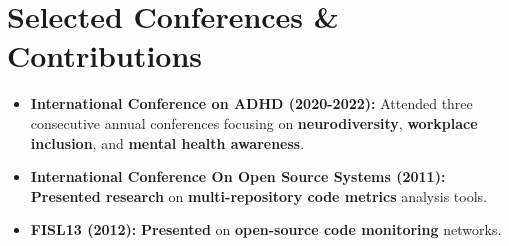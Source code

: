 \section{Selected Conferences \& Contributions}
\begin{itemize}
    \item \footnotesize{\textbf{International Conference on ADHD (2020-2022):}}\scriptsize{ Attended three consecutive annual conferences focusing on \textbf{neurodiversity}, \textbf{workplace inclusion}, and \textbf{mental health awareness}.}
    \item \footnotesize{\textbf{International Conference On Open Source Systems (2011):}}\scriptsize{ \textbf{Presented research} on \textbf{multi-repository code metrics} analysis tools.}
    \item \footnotesize{\textbf{FISL13 (2012):}}\scriptsize{ \textbf{Presented} on \textbf{open-source code monitoring} networks.}
\end{itemize}